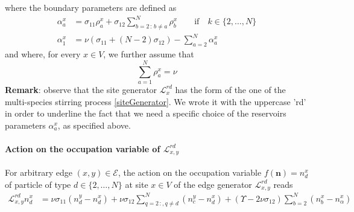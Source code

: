 \documentclass[11pt]{article}
\numberwithin{equation}{section}
\numberwithin{equation}{subsection}
\begin{document}
where the boundary parameters are defined as
\begin{equation}\label{boundaryParamRD}
	\begin{split}
		\alpha_{a}^{x}&=\sigma_{11}\rho_{a}^{x}+\sigma_{12}\sum_{b=2\,:\,b\neq a}^{N}\rho_{b}^{x}\qquad \text{if} \quad k\in \{2,\ldots,N\}\\
		\alpha_{1}^{x}&=\nu\left(\sigma_{11}+(N-2)\sigma_{12}\right)-\sum_{a=2}^{N}\alpha_{a}^{x}
	\end{split}
\end{equation}
and where, for every $x\in V$, we further assume that
\begin{equation}
	\sum_{a=1}^{N}\rho_{a}^{x}=\nu
\end{equation}
\textbf{Remark}: observe that the site generator $\mathcal{L}_{x}^{rd}$ has the form of the one of the multi-species stirring process \eqref{siteGenerator}. We wrote it with the uppercase 'rd' in order to underline the fact that we need a specific choice of the reservoirs parameters $\alpha_{a}^{x}$, as specified above. 
\paragraph{Action on the occupation variable of $\mathcal{L}_{x,y}^{rd}$}
For arbitrary edge $(x,y)\in \mathcal{E}$, the action on the occupation variable $f(\bm{n})=n_{d}^{x}$ of particle of type $d\in \{2,\ldots,N\}$ at site $x\in V $ of the edge generator $\mathcal{L}_{x,y}^{rd}$ reads
\begin{equation}\label{actionGraphRD}
	\begin{split}
		\mathcal{L}_{x,y}^{rd}n_{d}^{x}&=\nu \sigma_{11}(n_{d}^{y}-n_{d}^{x})+\nu\sigma_{12}\sum_{q=2\,:	,q\neq d}^{N}(n_{c}^{y}-n_{d}^{x})+(\Upsilon-2\nu\sigma_{12})\sum_{b=2}^{N}(n_{b}^{x}-n_{\alpha}^{x})
	\end{split}
\end{equation}
\end{document}
